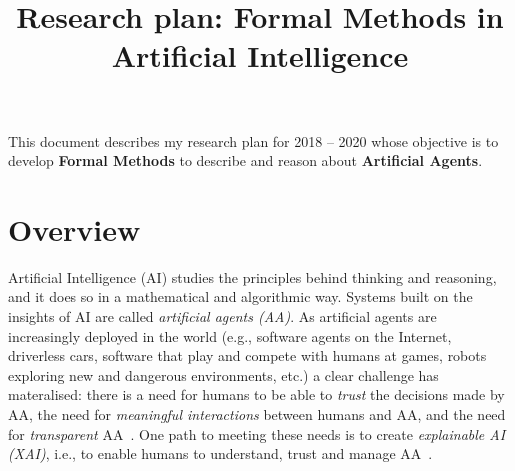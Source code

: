 \documentclass[10pt,a4paper,sans]{moderncv}
\title{Research plan: Formal Methods in Artificial Intelligence}
\begin{document}
\makecvtitle


% 

This document describes my research plan for 2018 -- 2020 whose objective is to develop \textbf{Formal Methods} to describe and reason about \textbf{Artificial Agents}.

\section{Overview}


Artificial Intelligence (AI) studies the principles behind thinking and reasoning, and it does so 
in a mathematical and algorithmic way. 
Systems built on the insights of AI are called \emph{artificial agents (AA)}. 
As artificial agents are increasingly deployed in the world (e.g., 
software agents on the Internet, driverless cars, software that play and compete with humans at games, 
robots exploring new and dangerous environments, etc.) a clear challenge has materalised: 
there is a need for humans to be able to \emph{trust} 
the decisions made by AA, the need for \emph{meaningful interactions} between humans and AA, 
and the need for \emph{transparent} AA~\cite{ACMStatement07}. One path to meeting these needs is 
to create \emph{explainable AI (XAI)}, i.e., to enable humans to understand, trust and manage AA~\cite{DARPA}.
\end{document}
